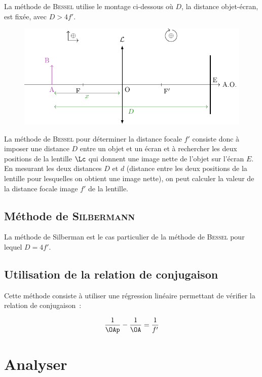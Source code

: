 \documentclass[../main/main.tex]{subfiles}
\begin{document}
{	La méthode de \textsc{Bessel} utilise le montage ci-dessous où $D$, la
	distance objet-écran, est fixée, avec $D>4f'$.
	\begin{figure}[]
		\centering
		\includegraphics[width=.8\linewidth]{lent_conv-condition_plain}
	\end{figure}

	La méthode de \textsc{Bessel} pour déterminer la distance focale $f'$ consiste
	donc à imposer une distance $D$ entre un objet et un écran et à rechercher les
	deux positions de la lentille $\Lc$ qui donnent une image nette de l'objet sur
	l'écran $E$. En mesurant les deux distances $D$ et $d$ (distance entre les
	deux positions de la lentille pour lesquelles on obtient une image nette), on
	peut calculer la valeur de la distance focale image $f'$ de la lentille.

	\subsection{Méthode de \textsc{Silbermann}}

	La méthode de Silberman est le cas particulier de la méthode de
	\textsc{Bessel} pour lequel $D=4f'$.

	\subsection{Utilisation de la relation de conjugaison}

	Cette méthode consiste à utiliser une régression linéaire permettant de
	vérifier la relation de conjugaison~:

	\[
		\frac{1}{\OAp}-\dfrac{1}{\OA} = \dfrac{1}{f'}
	\]
}

\setcounter{section}{2}
\section{Analyser}
\end{document}
